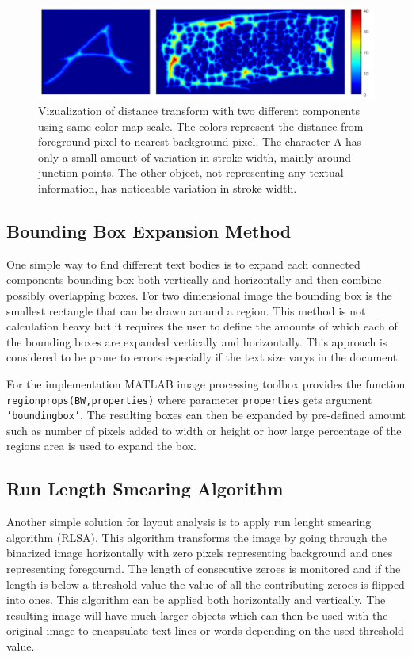 \documentclass{article}
\def\code#1{\texttt{#1}}
\begin{document}
          \begin{figure}[!ht]
            \centering
            \includegraphics[natwidth=863,natheight=239,scale=0.5]{strokecomparison.png}
            \caption{Vizualization of distance transform with two different components using same color map scale. The colors represent the distance from foreground pixel to nearest background pixel. The character A has only a small amount of variation in stroke width, mainly around junction points. The other object, not representing any textual information, has noticeable variation in stroke width. \label{fig:strokewidth} }
          \end{figure}

        \subsection{Bounding Box Expansion Method}
          One simple way to find different text bodies is to expand each connected components bounding box both vertically and horizontally and then combine possibly overlapping boxes. For two dimensional image the bounding box is the smallest rectangle that can be drawn around a region. This method is not calculation heavy but it requires the user to define the amounts of which each of the bounding boxes are expanded vertically and horizontally. This approach is considered to be prone to errors especially if the text size varys in the document.

          For the implementation MATLAB image processing toolbox provides the function \code{regionprops(BW,properties)} where parameter \code{properties} gets argument \code{'boundingbox'}. The resulting boxes can then be expanded by pre-defined amount such as number of pixels added to width or height or how large percentage of the regions area is used to expand the box.

        \subsection{Run Length Smearing Algorithm}
          Another simple solution for layout analysis is to apply run lenght smearing algorithm (RLSA). This algorithm transforms the image by going through the binarized image horizontally with zero pixels representing background and ones representing foregournd. The length of consecutive zeroes is monitored and if the length is below a threshold value the value of all the contributing zeroes is flipped into ones. This algorithm can be applied both horizontally and vertically. The resulting image will have much larger objects which can then be used with the original image to encapsulate text lines or words depending on the used threshold value.
\end{document}
